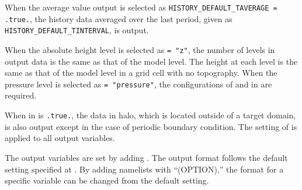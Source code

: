 When the average value output is selected as \verb|HISTORY_DEFAULT_TAVERAGE = .true.|,
the history data averaged over the last period, given as \verb|HISTORY_DEFAULT_TINTERVAL|, is output.

When the absolute height level is selected as  \verb|= "z"|,
the number of levels in output data is the same as that of the model level.
The height at each level is the same as that of the model level in a grid cell with no topography.
When the pressure level is selected as  \verb|= "pressure"|,
the configurations of  and  in  are required.

When  in  is \verb|.true.|,
the data in halo, which is located outside of a target domain, is also output except in the case of periodic boundary condition.
The setting of  is applied to all output variables.\\


The output variables are set by adding .
The output format follows the default setting specified at .
By adding namelists with ``(OPTION),''
the format for a specific variable can be changed from the default setting.


